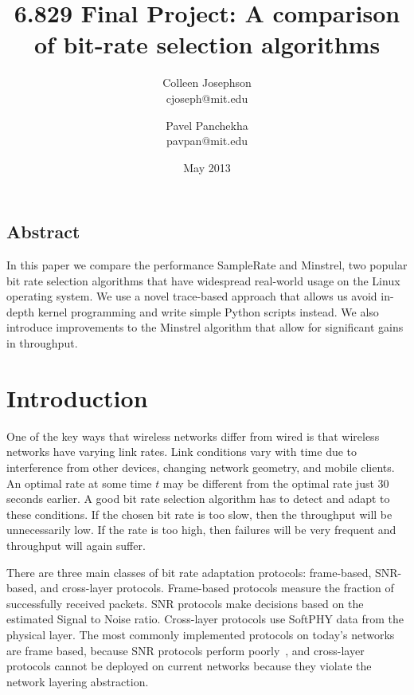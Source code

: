 \documentclass[letterpaper,twocolumn,10pt]{article}
\begin{document}

\title{\Large \bf 6.829 Final Project: A comparison of bit-rate selection algorithms}
\author{
{\rm Colleen Josephson}\\
cjoseph@mit.edu
\and
{\rm Pavel Panchekha}\\
pavpan@mit.edu
} %

\date{May 2013}

\maketitle


\subsection*{Abstract}
In this paper we compare the performance SampleRate and Minstrel, two popular bit rate selection algorithms that have widespread real-world usage on the Linux operating system. We use a novel trace-based approach that allows us avoid in-depth kernel programming and write simple Python scripts instead. We also introduce improvements to the Minstrel algorithm that allow for significant gains in throughput. 
\section{Introduction}

One of the key ways that wireless networks differ from wired is that wireless networks have varying link rates. Link conditions vary with time due to interference from other devices, changing network geometry, and mobile clients. An optimal rate at some time $t$ may be different from the optimal rate just 30 seconds earlier. A good bit rate selection algorithm has to detect and adapt to these conditions. If the chosen bit rate is too slow, then the throughput will be unnecessarily low. If the rate is too high, then failures will be very frequent and throughput will again suffer. 

There are three main classes of bit rate adaptation protocols: frame-based, SNR-based, and cross-layer protocols. Frame-based protocols measure the fraction of successfully received packets. SNR protocols make decisions based on the estimated Signal to Noise ratio. Cross-layer protocols use SoftPHY data from the physical layer. The most commonly implemented protocols on today's networks are frame based, because SNR protocols perform poorly~\cite{samplerate}, and cross-layer protocols cannot be deployed on current networks because they violate the network layering abstraction. 
\end{document}
